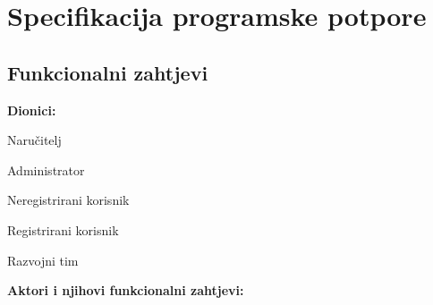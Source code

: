 \chapter{Specifikacija programske potpore}
		
	\section{Funkcionalni zahtjevi}
			
			
				
			
			
			\noindent \textbf{Dionici:}
			
			\begin{packed_enum}
				
				\item Naručitelj
				\item Administrator
				\item Neregistrirani korisnik	
				\item Registrirani korisnik
				\item Razvojni tim
				
			\end{packed_enum}
			
			\noindent \textbf{Aktori i njihovi funkcionalni zahtjevi:}
			
